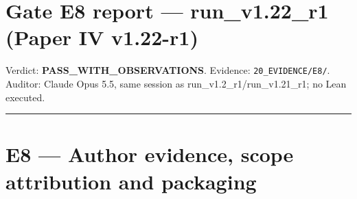 \documentclass[
]{article}
\author{}
\date{}
\begin{document}
\section{Gate E8 report --- run\_v1.22\_r1 (Paper IV
v1.22-r1)}\label{gate-e8-report--run_v122_r1-paper-iv-v122-r1}

Verdict: \textbf{PASS\_WITH\_OBSERVATIONS}. Evidence:
\texttt{20\_EVIDENCE/E8/}. Auditor: Claude Opus 5.5, same session as
run\_v1.2\_r1/run\_v1.21\_r1; no Lean executed.

\begin{center}\rule{0.5\linewidth}{0.5pt}\end{center}

\section{E8 --- Author evidence, scope attribution and
packaging}\label{e8--author-evidence-scope-attribution-and-packaging}
\end{document}
